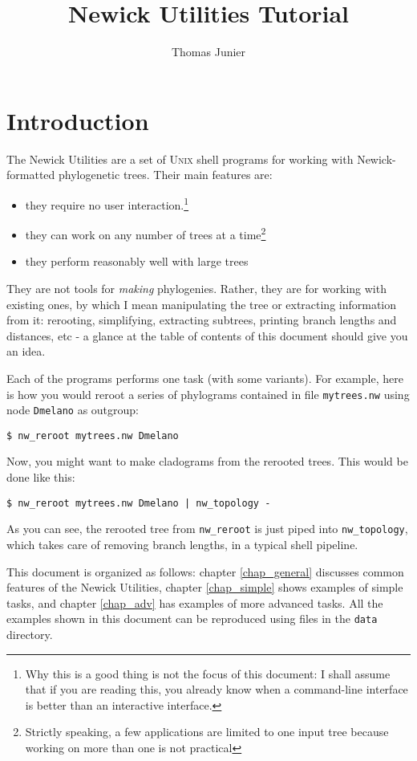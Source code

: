 \documentclass[a4paper,10pt]{report}
\title{Newick Utilities Tutorial}
\author{Thomas Junier}
\newcommand{\nutils}{Newick Utilities}
\newcommand{\unix}{\textsc{Unix}}
\newcommand{\reroot}{\texttt{nw\_reroot}}
\newcommand{\topology}{\texttt{nw\_topology}}
\begin{document}
\maketitle
\tableofcontents

\chapter{Introduction}

The \nutils{} are a set of \unix{} shell programs for working with Newick-formatted phylogenetic trees. Their main features are:
\begin{itemize}
 \item they require no user interaction.\footnote{Why this is a good thing is not the focus of this document: I shall assume that if you are reading this, you already know when a command-line interface is better than an interactive interface.}
 \item they can work on any number of trees at a time\footnote{Strictly speaking, a few applications are limited to one input tree because working on more than one is not practical}
 \item they perform reasonably well with large trees
\end{itemize}
They are not tools for \emph{making} phylogenies. Rather, they are for working with existing ones, by which I mean manipulating the tree or extracting information from it: rerooting, simplifying, extracting subtrees, printing branch lengths and distances, etc - a glance at the table of contents of this document should give you an idea.

Each of the programs performs one task (with some variants). For example, here is how you would reroot a series of phylograms contained in file \texttt{mytrees.nw} using node \texttt{Dmelano} as outgroup:

\begin{verbatim}
$ nw_reroot mytrees.nw Dmelano
\end{verbatim} 
Now, you might want to make cladograms from the rerooted trees. This would be done like this:
\begin{verbatim}
$ nw_reroot mytrees.nw Dmelano | nw_topology -
\end{verbatim}
As you can see, the rerooted tree from \reroot{} is just piped into \topology, which takes care of removing branch lengths, in a typical shell pipeline.

This document is organized as follows: chapter \ref{chap_general} discusses common features of the \nutils, chapter \ref{chap_simple} shows examples of simple tasks, and chapter \ref{chap_adv} has examples of more advanced tasks. All the examples shown in this document can be reproduced using files in the \texttt{data} directory.
\end{document}
